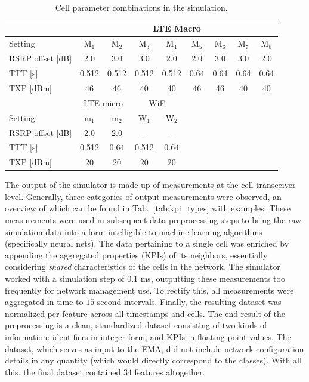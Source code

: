 			\begin{table}[t]
				\renewcommand*{\arraystretch}{1.2}
				\centering
				\begin{tabular} {l|c c c c c c c c}
										& \multicolumn{8}{c}{LTE Macro} \\ 
					\hline
					Setting 			& M$_{1}$	& M$_{2}$	& M$_{3}$	&	M$_{4}$	& M$_{5}$	& M$_{6}$	& M$_{7}$	& M$_{8}$	\\
					\hline 
					RSRP offset [dB] 	& 2.0		& 3.0		& 3.0		& 2.0		& 2.0		& 3.0		& 3.0		& 2.0		\\
					TTT [s]				& 0.512		& 0.512		& 0.512		& 0.512		& 0.64		& 0.64		& 0.64		& 0.64		\\
					TXP [dBm]			& 46		& 46		& 40		& 40		& 46		& 46		& 40		& 40		\\
					\hline						
										& \multicolumn{2}{c|}{LTE micro} 			& \multicolumn{2}{c}{WiFi} 			& & & & \\
					\cline{1-5}
					Setting 			& m$_1$	& \multicolumn{1}{c|}{m$_2$}		& W$_1$	& \multicolumn{1}{c}{W$_2$}	& & & & \\
					\cline{1-5} 
					RSRP offset [dB] 	& 2.0	& \multicolumn{1}{c|}{2.0}			& -		& \multicolumn{1}{c}{-}		& & & & \\
					TTT [s]				& 0.512	& \multicolumn{1}{c|}{0.64}			& 0.512	& \multicolumn{1}{c}{0.64}	& & & & \\
					TXP [dBm]			& 20	& \multicolumn{1}{c|}{20}			& 20	& \multicolumn{1}{c}{20}	& & & & \\
				\end{tabular}
				\caption[Cell parameters in the EMA simulation]{Cell parameter combinations in the simulation.}
				\label{tab:cell_params_1}
			\end{table}

			The output of the simulator is made up of measurements at the cell transceiver level.
			Generally, three categories of output measurements were observed, an overview of which can be found in Tab.~\ref{tab:kpi_types} with examples.
			These measurements were used in subsequent data preprocessing steps to bring the raw simulation data into a form intelligible to machine learning algorithms (specifically neural nets).
			The data pertaining to a single cell was enriched by appending the aggregated properties (\acp{KPI}) of its neighbors, essentially considering \textit{shared} characteristics of the cells in the network.
			The simulator worked with a simulation step of $0.1$ ms, outputting these measurements too frequently for network management use.
			To rectify this, all measurements were aggregated in time to $15$ second intervals.
			Finally, the resulting dataset was normalized per feature across all timestamps and cells.
			The end result of the preprocessing is a clean, standardized dataset consisting of two kinds of information: identifiers in integer form, and \acp{KPI} in floating point values.
			The dataset, which serves as input to the \ac{EMA}, did not include network configuration details in any quantity (which would directly correspond to the classes).
			With all this, the final dataset contained $34$ features altogether.
			
